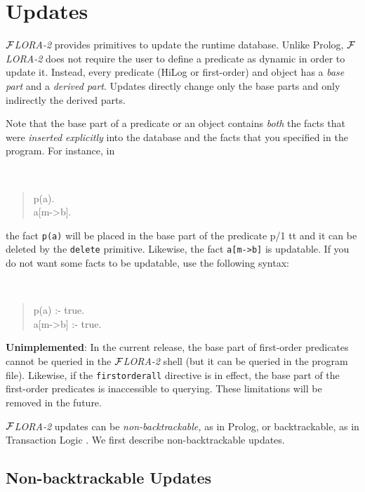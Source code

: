 \documentclass[11pt]{article}
\newcommand{\FLORA}{{\mbox{${\cal F}${\small\it LORA}\rm\emph{-2}}}\xspace}
\begin{document}
\section{Updates}\label{sec-updates}


%
\FLORA provides primitives to update the runtime database. Unlike Prolog,
\FLORA does not require the user to define a predicate as dynamic in order
to update it. Instead, every predicate (HiLog or first-order) and object
has a \emph{base part} and a \emph{derived part}.  Updates directly change
only the base parts and only indirectly the derived parts.

Note that the base part of a predicate or an object contains \emph{both}
the facts that were \emph{inserted explicitly} into the database and the
facts that you specified in the program. For instance, in
{\tt
\begin{quote}
 p(a).\\
 a[m->b].
\end{quote}
}
\noindent
the fact {\tt p(a)} will be placed in the base part of the predicate p/1 tt
and it can be deleted by the {\tt delete} primitive. Likewise,
the fact {\tt a[m->b]} is updatable. If you do not want
some facts to be updatable, use the following syntax:
{\tt
\begin{quote}
 p(a) :- true.\\
 a[m->b] :- true.
\end{quote}
}

{\bf Unimplemented}: In the current release, the base part of first-order
predicates cannot be queried in the \FLORA shell (but it can be queried in
the program file).  Likewise, if the {\tt firstorderall} directive is in
effect, the base part of the first-order predicates is inaccessible to
querying.  These limitations will be removed in the future.


\FLORA updates can be \emph{non-backtrackable,} as in Prolog,
or backtrackable, as in Transaction Logic \cite{trans-tcs94}.
We first describe non-backtrackable updates.


\subsection{Non-backtrackable Updates} \label{sec:non-backtrackable-updates}
\end{document}
